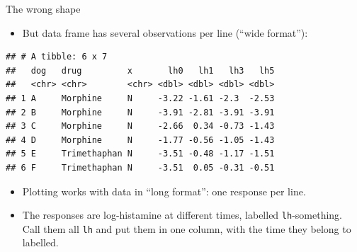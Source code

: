 \documentclass[ignorenonframetext,]{beamer}
\newenvironment{Shaded}{\begin{snugshade}}{\end{snugshade}}
\newcommand{\DecValTok}[1]{\textcolor[rgb]{0.00,0.00,0.81}{#1}}
\newcommand{\KeywordTok}[1]{\textcolor[rgb]{0.13,0.29,0.53}{\textbf{#1}}}
\newcommand{\NormalTok}[1]{#1}
\newcommand{\OperatorTok}[1]{\textcolor[rgb]{0.81,0.36,0.00}{\textbf{#1}}}
\newcommand{\StringTok}[1]{\textcolor[rgb]{0.31,0.60,0.02}{#1}}
\providecommand{\tightlist}{%
  \setlength{\itemsep}{0pt}\setlength{\parskip}{0pt}}
\begin{document}
\begin{frame}[fragile]{The wrong shape}
\protect\hypertarget{the-wrong-shape}{}

\begin{itemize}
\tightlist
\item
  But data frame has several observations per line (``wide format''):
\end{itemize}

\scriptsize

\begin{Shaded}
\end{Shaded}

\begin{verbatim}
## # A tibble: 6 x 7
##   dog   drug         x       lh0   lh1   lh3   lh5
##   <chr> <chr>        <chr> <dbl> <dbl> <dbl> <dbl>
## 1 A     Morphine     N     -3.22 -1.61 -2.3  -2.53
## 2 B     Morphine     N     -3.91 -2.81 -3.91 -3.91
## 3 C     Morphine     N     -2.66  0.34 -0.73 -1.43
## 4 D     Morphine     N     -1.77 -0.56 -1.05 -1.43
## 5 E     Trimethaphan N     -3.51 -0.48 -1.17 -1.51
## 6 F     Trimethaphan N     -3.51  0.05 -0.31 -0.51
\end{verbatim}

\normalsize

\begin{itemize}
\item
  Plotting works with data in ``long format'': one response per line.
\item
  The responses are log-histamine at different times, labelled
  \texttt{lh}-something. Call them all \texttt{lh} and put them in one
  column, with the time they belong to labelled.
\end{itemize}

\end{frame}
\end{document}
